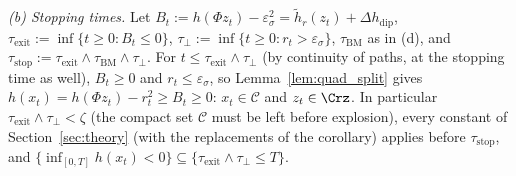 \emph{(b) Stopping times.} Let \(B_t := h(\Phi z_t) - \varepsilon_\sigma^2 = \tilde h_r(z_t) + \Delta h_{\mathrm{dip}}\), \(\tau_{\mathrm{exit}} := \inf\{t \ge 0 : B_t \le 0\}\), \(\tau_\perp := \inf\{t \ge 0 : r_t > \varepsilon_\sigma\}\), \(\tau_{\mathrm{BM}}\) as in (d), and \(\tau_{\mathrm{stop}} := \tau_{\mathrm{exit}} \wedge \tau_{\mathrm{BM}} \wedge \tau_\perp\). For \(t \le \tau_{\mathrm{exit}}\wedge\tau_\perp\) (by continuity of paths, at the stopping time as well), \(B_t \ge 0\) and \(r_t \le \varepsilon_\sigma\), so Lemma~\ref{lem:quad_split} gives \(h(x_t) = h(\Phi z_t) - r_t^2 \ge B_t \ge 0\): \(x_t \in \mathcal{C}\) and \(z_t \in \Crz\). In particular \(\tau_{\mathrm{exit}}\wedge\tau_\perp < \zeta\) (the compact set \(\mathcal{C}\) must be left before explosion), every constant of Section~\ref{sec:theory} (with the replacements of the corollary) applies before \(\tau_{\mathrm{stop}}\), and \(\{\inf_{[0,T]}h(x_t) < 0\} \subseteq \{\tau_{\mathrm{exit}}\wedge\tau_\perp \le T\}\).

